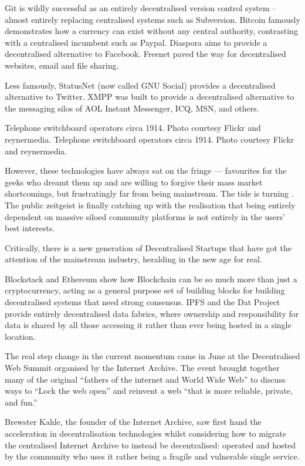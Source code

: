 \documentclass{tnreport}
\begin{document}
Git is wildly successful as an entirely decentralised version control system – almost entirely replacing centralised systems such as Subversion. Bitcoin famously demonstrates how a currency can exist without any central authority, contrasting with a centralised incumbent such as Paypal. Diaspora aims to provide a decentralised alternative to Facebook. Freenet paved the way for decentralised websites, email and file sharing.

Less famously, StatusNet (now called GNU Social) provides a decentralised alternative to Twitter. XMPP was built to provide a decentralised alternative to the messaging silos of AOL Instant Messenger, ICQ, MSN, and others.

Telephone switchboard operators circa 1914. Photo courtesy Flickr and reynermedia.
Telephone switchboard operators circa 1914. Photo courtesy Flickr and reynermedia.

However, these technologies have always sat on the fringe — favourites for the geeks who dreamt them up and are willing to forgive their mass market shortcomings, but frustratingly far from being mainstream. The tide is turning . The public zeitgeist is finally catching up with the realisation that being entirely dependent on massive siloed community platforms is not entirely in the users’ best interests.

Critically, there is a new generation of Decentralised Startups that have got the attention of the mainstream industry, heralding in the new age for real.

Blockstack and Ethereum show how Blockchain can be so much more than just a cryptocurrency, acting as a general purpose set of building blocks for building decentralised systems that need strong consensus. IPFS and the Dat Project provide entirely decentralised data fabrics, where ownership and responsibility for data is shared by all those accessing it rather than ever being hosted in a single location.

The real step change in the current momentum came in June at the Decentralised Web Summit organised by the Internet Archive. The event brought together many of the original “fathers of the internet and World Wide Web” to discuss ways to “Lock the web open” and reinvent a web “that is more reliable, private, and fun.”

Brewster Kahle, the founder of the Internet Archive, saw first hand the acceleration in decentralisation technologies whilst considering how to migrate the centralised Internet Archive to instead be decentralised: operated and hosted by the community who uses it rather being a fragile and vulnerable single service.
\end{document}
